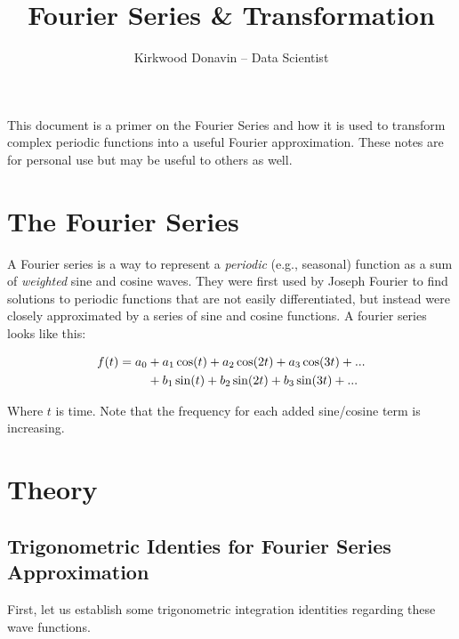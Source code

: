 \documentclass[10pt]{article} %
\title{Fourier Series \& Transformation} %
\author{Kirkwood Donavin -- Data Scientist} %
\date{} %
\begin{document}
\maketitle

This document is a primer on the Fourier Series and how it is used to transform complex periodic functions into a useful Fourier approximation. These notes are for personal use but may be useful to others as well.

\section*{The Fourier Series} %

A Fourier series is a way to represent a \textit{periodic} (e.g., seasonal) function as a sum of \textit{weighted} sine and cosine waves. They were first used by Joseph Fourier to find solutions to periodic functions that are not easily differentiated, but instead were closely approximated by a series of sine and cosine functions. A fourier series looks like this:

\begin{align}
f(t) = a_0 & + a_1\cos(t) + a_2\cos(2t) + a_3\cos(3t) + ... \\
           & + b_1\sin(t) + b_2\sin(2t) + b_3\sin(3t) + ... \notag
\end{align}

Where $t$ is time. Note that the frequency for each added sine/cosine term is increasing.

\section*{Theory}

\subsection*{Trigonometric Identies for Fourier Series Approximation}

First, let us establish some trigonometric integration identities regarding these wave functions.
\end{document}
